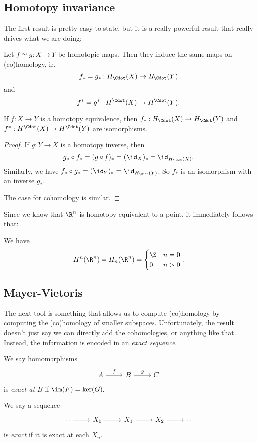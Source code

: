 \documentclass[a4paper]{article}
\begin{document}
\subsection{Homotopy invariance}
The first result is pretty easy to state, but it is a really powerful result that really drives what we are doing:

\begin{thm}
  Let $f \simeq g: X \to Y$ be homotopic maps. Then they induce the same maps on (co)homology, ie.
  \[
    f_* = g_*: H_\Cdot(X) \to H_\Cdot(Y)
  \]
  and
  \[
    f^* = g^* : H^\Cdot(X) \to H^\Cdot(Y).
  \]
\end{thm}

\begin{cor}
  If $f: X \to Y$ is a homotopy equivalence, then $f_*: H_{\Cdot}(X) \to H_{\Cdot}(Y)$ and $f^*: H^{\Cdot}(X) \to H^{\Cdot}(Y)$ are isomorphisms.
\end{cor}

\begin{proof}
  If $g: Y \to X$ is a homotopy inverse, then
  \[
    g_* \circ f_* = (g \circ f)_* = (\id_X)_* = \id_{H_{\Cdot}(X)}.
  \]
  Similarly, we have $f_* \circ g_* = (\id_Y)_* = \id_{H_{\Cdot}(Y)}$. So $f_*$ is an isomorphism with an inverse $g_*$.

  The case for cohomology is similar.
\end{proof}

Since we know that $\R^n$ is homotopy equivalent to a point, it immediately follows that:
\begin{eg}
  We have
  \[
    H^n(\R^n) = H_n(\R^n) =
    \begin{cases}
      \Z & n = 0\\
      0 & n > 0
    \end{cases}.
  \]
\end{eg}

\subsection{Mayer-Vietoris}
The next tool is something that allows us to compute (co)homology by computing the (co)homology of smaller subspaces. Unfortunately, the result doesn't just say we can directly add the cohomologies, or anything like that. Instead, the information is encoded in an \emph{exact sequence}.

\begin{defi}
  We say homomorphisms
  \[
    \begin{tikzcd}
      A \ar[r, "f"] & B \ar[r, "g"] & C
    \end{tikzcd}
  \]
  is \emph{exact at $B$} if $\im(F) = \ker(G)$.

  We say a sequence
  \[
    \begin{tikzcd}
      \cdots \ar[r] & X_0 \ar[r] & X_1 \ar[r] & X_2 \ar[r] & \cdots
    \end{tikzcd}
  \]
  is \emph{exact} if it is exact at each $X_n$.
\end{defi}
\end{document}
